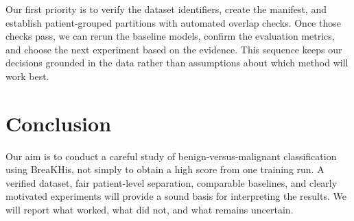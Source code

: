 \documentclass[11pt,a4paper]{article}
\begin{document}
Our first priority is to verify the dataset identifiers, create the manifest, and establish patient-grouped partitions with automated overlap checks. Once those checks pass, we can rerun the baseline models, confirm the evaluation metrics, and choose the next experiment based on the evidence. This sequence keeps our decisions grounded in the data rather than assumptions about which method will work best.

\section{Conclusion}

Our aim is to conduct a careful study of benign-versus-malignant classification using BreaKHis, not simply to obtain a high score from one training run. A verified dataset, fair patient-level separation, comparable baselines, and clearly motivated experiments will provide a sound basis for interpreting the results. We will report what worked, what did not, and what remains uncertain.
\end{document}
